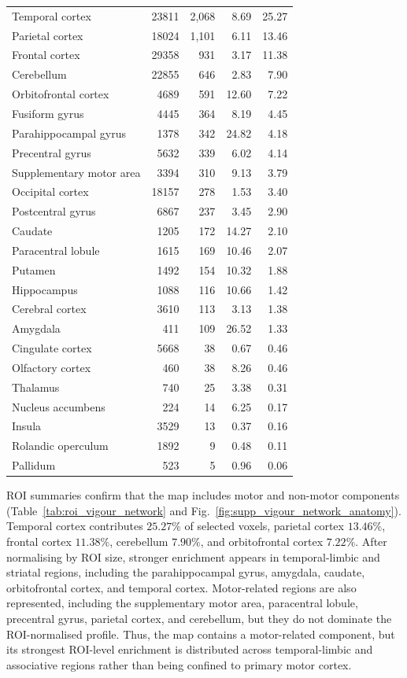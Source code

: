 \documentclass[utf8]{frontiers_suppmat}
\begin{document}
\begin{longtable}{@{} p{5.2cm} r r r r @{}}
    Temporal cortex & 23811 & 2,068 & 8.69 & 25.27 \\
    Parietal cortex & 18024 & 1,101 & 6.11 & 13.46 \\
    Frontal cortex & 29358 & 931 & 3.17 & 11.38 \\
    Cerebellum & 22855 & 646 & 2.83 & 7.90 \\
    Orbitofrontal cortex & 4689 & 591 & 12.60 & 7.22 \\
    Fusiform gyrus & 4445 & 364 & 8.19 & 4.45 \\
    Parahippocampal gyrus & 1378 & 342 & 24.82 & 4.18 \\
    Precentral gyrus & 5632 & 339 & 6.02 & 4.14 \\
    Supplementary motor area & 3394 & 310 & 9.13 & 3.79 \\
    Occipital cortex & 18157 & 278 & 1.53 & 3.40 \\
    Postcentral gyrus & 6867 & 237 & 3.45 & 2.90 \\
    Caudate & 1205 & 172 & 14.27 & 2.10 \\
    Paracentral lobule & 1615 & 169 & 10.46 & 2.07 \\
    Putamen & 1492 & 154 & 10.32 & 1.88 \\
    Hippocampus & 1088 & 116 & 10.66 & 1.42 \\
    Cerebral cortex & 3610 & 113 & 3.13 & 1.38 \\
    Amygdala & 411 & 109 & 26.52 & 1.33 \\
    Cingulate cortex & 5668 & 38 & 0.67 & 0.46 \\
    Olfactory cortex & 460 & 38 & 8.26 & 0.46 \\
    Thalamus & 740 & 25 & 3.38 & 0.31 \\
    Nucleus accumbens & 224 & 14 & 6.25 & 0.17 \\
    Insula & 3529 & 13 & 0.37 & 0.16 \\
    Rolandic operculum & 1892 & 9 & 0.48 & 0.11 \\
    Pallidum & 523 & 5 & 0.96 & 0.06 \\
\end{longtable}

ROI summaries confirm that the map includes motor and non-motor components (Table~\ref{tab:roi_vigour_network} and Fig.~\ref{fig:supp_vigour_network_anatomy}). Temporal cortex contributes \(25.27\%\) of selected voxels, parietal cortex \(13.46\%\), frontal cortex \(11.38\%\), cerebellum \(7.90\%\), and orbitofrontal cortex \(7.22\%\). After normalising by ROI size, stronger enrichment appears in temporal-limbic and striatal regions, including the parahippocampal gyrus, amygdala, caudate, orbitofrontal cortex, and temporal cortex. Motor-related regions are also represented, including the supplementary motor area, paracentral lobule, precentral gyrus, parietal cortex, and cerebellum, but they do not dominate the ROI-normalised profile. Thus, the map contains a motor-related component, but its strongest ROI-level enrichment is distributed across temporal-limbic and associative regions rather than being confined to primary motor cortex.
\end{document}
